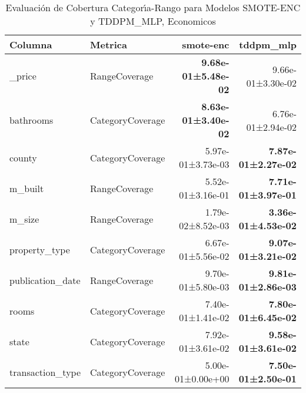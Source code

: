 \begin{table}[H]
\centering
\fontsize{10}{14}\selectfont
\caption{Evaluaci\'on de Cobertura Categor{\'\i}a-Rango para Modelos SMOTE-ENC y TDDPM\_MLP, Economicos}
\label{table-coverage-economicos-a}
\begin{tabular}{|l|l|r|r|}
\hline
\rowcolor[gray]{0.8}
Columna & Metrica & smote-enc & tddpm\_mlp \\
\hline \_price & RangeCoverage & \bfseries 9.68e-01±5.48e-02 & 9.66e-01±3.30e-02 \\
\hline bathrooms & CategoryCoverage & \bfseries 8.63e-01±3.40e-02 & 6.76e-01±2.94e-02 \\
\hline county & CategoryCoverage & 5.97e-01±3.73e-03 & \bfseries 7.87e-01±2.27e-02 \\
\hline m\_built & RangeCoverage & 5.52e-01±3.16e-01 & \bfseries 7.71e-01±3.97e-01 \\
\hline m\_size & RangeCoverage & 1.79e-02±8.52e-03 & \bfseries 3.36e-01±4.53e-02 \\
\hline property\_type & CategoryCoverage & 6.67e-01±5.56e-02 & \bfseries 9.07e-01±3.21e-02 \\
\hline publication\_date & RangeCoverage & 9.70e-01±5.80e-03 & \bfseries 9.81e-01±2.86e-03 \\
\hline rooms & CategoryCoverage & 7.40e-01±1.41e-02 & \bfseries 7.80e-01±6.45e-02 \\
\hline state & CategoryCoverage & 7.92e-01±3.61e-02 & \bfseries 9.58e-01±3.61e-02 \\
\hline transaction\_type & CategoryCoverage & 5.00e-01±0.00e+00 & \bfseries 7.50e-01±2.50e-01 \\
\hline
\end{tabular}
\end{table}
